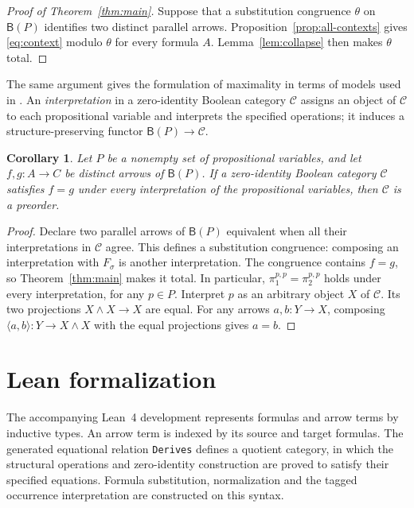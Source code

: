 \documentclass[11pt]{article}
\newtheorem{corollary}[theorem]{Corollary}
\newcommand{\B}{\mathsf B}
\begin{document}
\begin{proof}[Proof of Theorem~\ref{thm:main}]
Suppose that a substitution congruence $\theta$ on $\B(P)$ identifies
two distinct parallel arrows. Proposition~\ref{prop:all-contexts}
gives \eqref{eq:context} modulo $\theta$ for every formula $A$.
Lemma~\ref{lem:collapse} then makes $\theta$ total.
\end{proof}

The same argument gives the formulation of maximality in terms of
models used in \cite[\S9.3, p.~194]{DP}. An \emph{interpretation} in
a zero-identity Boolean category $\mathcal C$ assigns an object of
$\mathcal C$ to each propositional variable and interprets the
specified operations; it induces a structure-preserving functor
$\B(P)\to\mathcal C$.

\begin{corollary}\label{cor:models}
Let $P$ be a nonempty set of propositional variables, and let
$f,g:A\to C$ be distinct arrows of $\B(P)$.
If a zero-identity Boolean category $\mathcal C$ satisfies $f=g$
under every interpretation of the propositional variables, then
$\mathcal C$ is a preorder.
\end{corollary}

\begin{proof}
Declare two parallel arrows of $\B(P)$ equivalent when all their
interpretations in $\mathcal C$ agree. This defines a substitution
congruence: composing an interpretation with $F_\sigma$ is another
interpretation. The congruence contains $f=g$, so
Theorem~\ref{thm:main} makes it total. In particular,
$\pi_1^{p,p}=\pi_2^{p,p}$ holds under every interpretation, for any
$p\in P$. Interpret $p$ as an arbitrary object $X$ of $\mathcal C$.
Its two projections $X\wedge X\to X$ are equal. For any arrows $a,b:Y\to X$, composing
$\langle a,b\rangle:Y\to X\wedge X$ with the equal projections gives $a=b$.
\end{proof}

\section{Lean formalization}\label{sec:formalization}

The accompanying Lean~4 development \cite{Formalization} represents
formulas and arrow terms by inductive types. An arrow term is indexed
by its source and target formulas. The generated equational relation
\texttt{Derives} defines a quotient category, in which the structural
operations and zero-identity construction are proved to satisfy their
specified equations. Formula substitution, normalization and the tagged
occurrence interpretation are constructed on this syntax.
\end{document}
